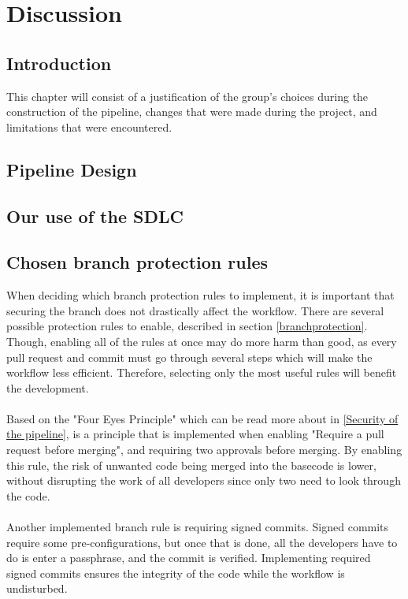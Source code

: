 \chapter{Discussion}
\section{Introduction}
This chapter will consist of a justification of the group's choices during the construction of the pipeline, changes that were made during the project, and limitations that were encountered.  

\section{Pipeline Design}

\section{Our use of the SDLC} %


\section{Chosen branch protection rules}
When deciding which branch protection rules to implement, it is important that securing the branch does not drastically affect the workflow. There are several possible protection rules to enable, described in section \ref{branchprotection}. Though, enabling all of the rules at once may do more harm than good, as every pull request and commit must go through several steps which will make the workflow less efficient. Therefore, selecting only the most useful rules will benefit the development. 
\\~\\
Based on the "Four Eyes Principle" which can be read more about in \ref{Security of the pipeline}, is a principle that is implemented when enabling "Require a pull request before merging", and requiring two approvals before merging. By enabling this rule, the risk of unwanted code being merged into the basecode is lower, without disrupting the work of all developers since only two need to look through the code. \cite{foureyes} 
\\~\\
Another implemented branch rule is requiring signed commits. Signed commits require some pre-configurations, but once that is done, all the developers have to do is enter a passphrase, and the commit is verified. Implementing required signed commits ensures the integrity of the code while the workflow is undisturbed.




